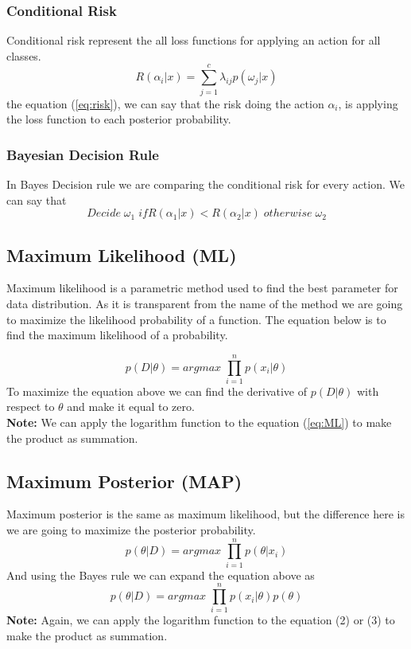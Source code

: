 \documentclass{article}
\begin{document}
\subsubsection{Conditional Risk}
Conditional risk represent the all loss functions for applying an action for all classes.
\begin{equation} \label{eq:risk}
    R(\alpha_i | x) = \sum_{j=1}^{c} \lambda_{ij} p(\omega_j | x) 
\end{equation}
the equation (\ref{eq:risk}), we can say that the risk doing the action $\alpha_i$, is applying the loss function to each posterior probability.

\subsubsection{Bayesian Decision Rule}
 In Bayes Decision rule we are comparing the conditional risk for every action. We can say that
 \begin{equation}
     Decide \; \omega_1 \; if R(\alpha_1 | x) < R(\alpha_2 | x) \; otherwise \; \omega_2  
 \end{equation}

\subsection{Maximum Likelihood (ML)}
Maximum likelihood is a parametric method used to find the best parameter for data distribution. As it is transparent from the name of the method we are going to maximize the likelihood probability of a function. The equation below is to find the maximum likelihood of a probability.

\begin{equation} \label{eq:ML}
    p(D|\theta) = argmax \; \prod_{i=1}^{n} p(x_i | \theta)
\end{equation}
To maximize the equation above we can find the derivative of $p(D|\theta)$ with respect to $\theta$ and make it equal to zero.\\
\textbf{Note:} We can apply the logarithm function to the equation (\ref{eq:ML}) to make the product as summation.

\subsection{Maximum Posterior (MAP)}
Maximum posterior is the same as maximum likelihood, but the difference here is we are going to maximize the posterior probability.
\begin{equation}
    p(\theta | D) = argmax \; \prod_{i=1}^{n} p(\theta | x_i)
\end{equation}
And using the Bayes rule we can expand the equation above as
\begin{equation}
    p(\theta | D) = argmax \; \prod_{i=1}^{n} p(x_i | \theta) p(\theta)
\end{equation}
\textbf{Note:} Again, we can apply the logarithm function to the equation (2) or (3) to make the product as summation.
\end{document}
